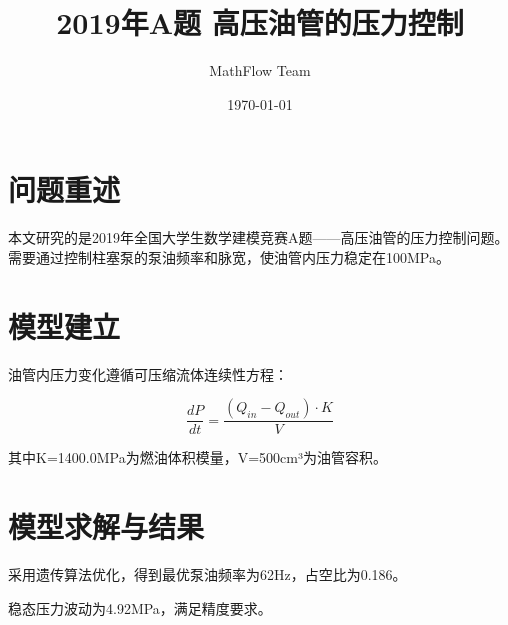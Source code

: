 \documentclass[12pt,a4paper]{article}
\title{2019年A题 高压油管的压力控制}
\author{MathFlow Team}
\date{\today}
\begin{document}
\maketitle
\tableofcontents
\newpage


\section{问题重述}


本文研究的是2019年全国大学生数学建模竞赛A题——高压油管的压力控制问题。需要通过控制柱塞泵的泵油频率和脉宽，使油管内压力稳定在100MPa。


\section{模型建立}


油管内压力变化遵循可压缩流体连续性方程：


\begin{equation}
  \frac{dP}{dt} = \frac{(Q_{in} - Q_{out}) \cdot K}{V}
  \label{eq:ode}
\end{equation}


其中K=1400.0MPa为燃油体积模量，V=500cm³为油管容积。


\section{模型求解与结果}


采用遗传算法优化，得到最优泵油频率为62Hz，占空比为0.186。


稳态压力波动为4.92MPa，满足精度要求。
\end{document}

